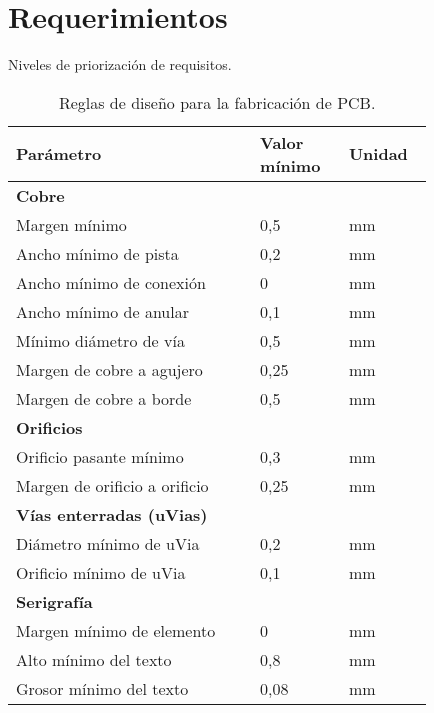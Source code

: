 \chapter{Requerimientos} %

\label{AppendixB}

\begin{table}[htbp]
	\small
	\centering
	\caption{Niveles de priorización de requisitos.}
	
	
	\label{tab:priorizacion}
\end{table}



\begin{table}[!hbp]
	\centering
	\small
	\caption{Reglas de diseño para la fabricación de PCB.}
	\label{tab:reglas_pcb}
	\begin{tabular}{p{0.5\linewidth}p{0.18\linewidth}p{0.15\linewidth}}
		\toprule
		\textbf{Parámetro} & \textbf{Valor mínimo} & \textbf{Unidad} \\
		\midrule
		\multicolumn{3}{l}{\textbf{Cobre}} \\
		\midrule
		Margen mínimo & 0,5 & mm \\
		Ancho mínimo de pista & 0,2 & mm \\
		Ancho mínimo de conexión & 0 & mm \\
		Ancho mínimo de anular & 0,1 & mm \\
		Mínimo diámetro de vía & 0,5 & mm \\
		Margen de cobre a agujero & 0,25 & mm \\
		Margen de cobre a borde & 0,5 & mm \\
		\midrule
		\multicolumn{3}{l}{\textbf{Orificios}} \\
		\midrule
		Orificio pasante mínimo & 0,3 & mm \\
		Margen de orificio a orificio & 0,25 & mm \\
		\midrule
		\multicolumn{3}{l}{\textbf{Vías enterradas (uVias)}} \\
		\midrule
		Diámetro mínimo de uVia & 0,2 & mm \\
		Orificio mínimo de uVia & 0,1 & mm \\
		\midrule
		\multicolumn{3}{l}{\textbf{Serigrafía}} \\
		\midrule
		Margen mínimo de elemento & 0 & mm \\
		Alto mínimo del texto & 0,8 & mm \\
		Grosor mínimo del texto & 0,08 & mm \\
		\bottomrule
	\end{tabular}
\end{table}


